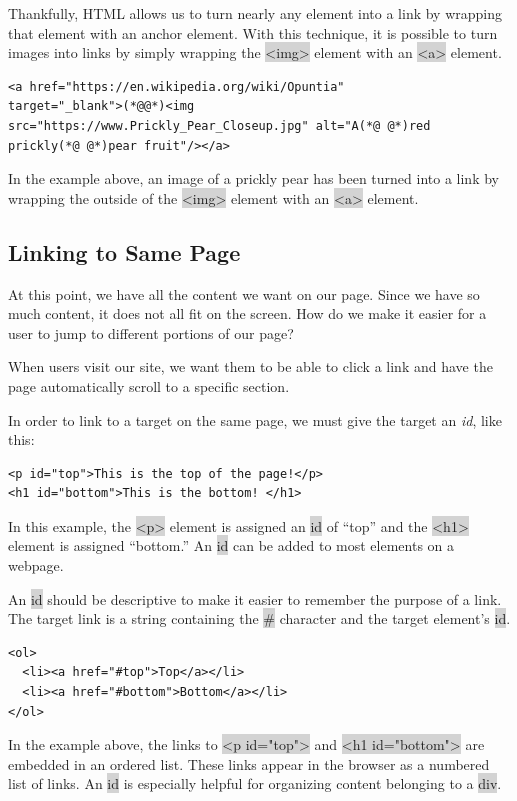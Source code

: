 \documentclass[11pt]{article}
\begin{document}
Thankfully, HTML allows us to turn nearly any element into a link by wrapping that element with an anchor element. With this technique, it is possible to turn images into links by simply wrapping the \colorbox{lightgray}{<img>} element with an \colorbox{lightgray}{<a>} element.
\begin{lstlisting}
<a href="https://en.wikipedia.org/wiki/Opuntia" 
target="_blank">(*@@*)<img
src="https://www.Prickly_Pear_Closeup.jpg" alt="A(*@ @*)red 
prickly(*@ @*)pear fruit"/></a>
\end{lstlisting}
In the example above, an image of a prickly pear has been turned into a link by wrapping the outside of the \colorbox{lightgray}{<img>} element with an \colorbox{lightgray}{<a>} element.

\subsection{Linking to Same Page}
At this point, we have all the content we want on our page. Since we have so much content, it does not all fit on the screen. How do we make it easier for a user to jump to different portions of our page?

When users visit our site, we want them to be able to click a link and have the page automatically scroll to a specific section.

In order to link to a target on the same page, we must give the target an \textit{id}, like this:
\begin{lstlisting}
<p id="top">This is the top of the page!</p>
<h1 id="bottom">This is the bottom! </h1>
\end{lstlisting}
In this example, the \colorbox{lightgray}{<p>} element is assigned an \colorbox{lightgray}{id} of “top” and the \colorbox{lightgray}{<h1>} element is assigned “bottom.” An \colorbox{lightgray}{id} can be added to most elements on a webpage.

An \colorbox{lightgray}{id} should be descriptive to make it easier to remember the purpose of a link. The target link is a string containing the \colorbox{lightgray}{\#} character and the target element’s \colorbox{lightgray}{id}.
\begin{lstlisting}
<ol>
  <li><a href="#top">Top</a></li>
  <li><a href="#bottom">Bottom</a></li>
</ol>
\end{lstlisting}
In the example above, the links to \colorbox{lightgray}{<p id="top">} and \colorbox{lightgray}{<h1 id="bottom">} are embedded in an ordered list. These links appear in the browser as a numbered list of links. An \colorbox{lightgray}{id} is especially helpful for organizing content belonging to a \colorbox{lightgray}{div}.
\end{document}
